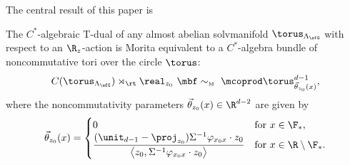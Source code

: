 The central result of this paper is
\begin{Theorem}
\label{thm:NCtorusbundlegen}
The $C^*$-algebraic T-dual of any almost abelian
solvmanifold $\torus_{\Lambda_\sfG}$ with respect to an $\R_z$-action
is Morita equivalent to a $C^*$-algebra bundle
of noncommutative tori over the circle $\torus$:
\begin{gather*}%
C(\torus_{\Lambda_\sfG})\rtimes_\rt\real_{ z_0}
 \ \mbf\sim_{\text{\tiny M}} \ \mcoprod
\torus^{d-1}_{\vec\theta_{z_0}(x)} ,
\end{gather*}
where the noncommutativity parameters $\vec\theta_{z_0}(x)\in\R^{d-2}$ are given
by
\begin{gather}\label{eq:thetaz0}
\vec\theta_{z_0}(x) = \begin{cases}
 0 & \mbox{for} \ x \in \F_* , \\
 \dfrac{(\unit_{d-1}-\proj_{ z_0}) \Sigma^{-1} \varphi_{x_0 x}\cdot
 z_0}{\big\langle{ z_0},\Sigma^{-1} \varphi_{x_0 x}\cdot z_0\big\rangle}
 & \mbox{for} \ x\in\R\setminus\F_* . \end{cases}
\end{gather}
\end{Theorem}

